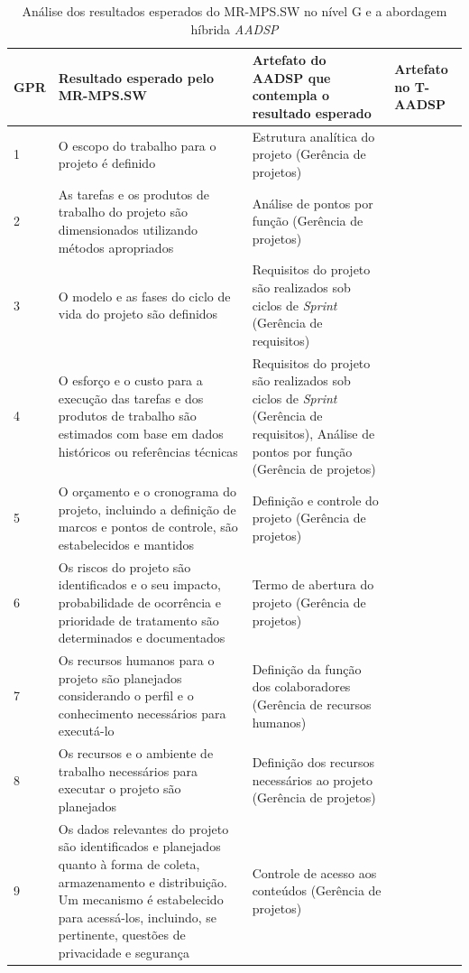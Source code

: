\documentclass{acm_proc_article-sp}
\begin{document}
\begin{appendices}
\begin{table}[h]
\scriptsize
\caption{Análise dos resultados esperados do MR-MPS.SW no nível G e a abordagem híbrida \textit{AADSP} \cite{aadsp:hibirdo}} 
\centering
\begin{tabular}{|p{10mm}|p{60mm}|p{60mm}|p{25mm}|}
\hline
\textbf{GPR} & \textbf{Resultado esperado pelo MR-MPS.SW} & \textbf{Artefato do AADSP que contempla o resultado esperado} & \textbf{Artefato no T-AADSP} \\
\hline
1 & O escopo do trabalho para o projeto é definido & Estrutura analítica do projeto
(Gerência de projetos) & \\
2 & As tarefas e os produtos de trabalho do projeto são dimensionados utilizando métodos apropriados & Análise de pontos por função (Gerência de projetos) & \\
3 & O modelo e as fases do ciclo de vida do projeto são definidos & Requisitos do projeto são realizados sob ciclos de \textit{Sprint} (Gerência de requisitos) &\\
4 &  O esforço e o custo para a execução das tarefas e dos produtos de trabalho são estimados com base em dados históricos ou referências técnicas & Requisitos do projeto são realizados sob ciclos de \textit{Sprint} (Gerência de requisitos), Análise de pontos por função (Gerência de projetos) & \\
5 & O orçamento e o cronograma do projeto, incluindo a definição de marcos e pontos de controle, são estabelecidos e mantidos
& Definição e controle do projeto (Gerência de projetos) & \\
6 & Os riscos do projeto são identificados e o seu impacto, probabilidade de ocorrência e prioridade de tratamento são
determinados e documentados & Termo de abertura do projeto (Gerência de projetos) & \\
7 & Os recursos humanos para o projeto são planejados considerando o perfil e o conhecimento necessários para executá-lo & Definição da função dos colaboradores (Gerência de recursos humanos) & \\
8 & Os recursos e o ambiente de trabalho necessários para executar o projeto são planejados & Definição dos recursos necessários ao projeto (Gerência de projetos) & \\
9 & Os dados relevantes do projeto são identificados e planejados quanto à forma de coleta, armazenamento e distribuição. Um mecanismo é estabelecido para acessá-los, incluindo, se pertinente, questões de privacidade e segurança & Controle de acesso aos conteúdos (Gerência de projetos) & \\

\end{tabular}
\end{table}
\end{appendices}
\end{document}
